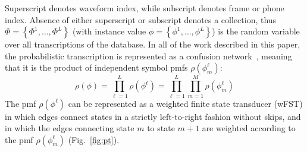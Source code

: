 Superscript denotes waveform index, while subscript denotes frame or
phone index.  Absence of either superscript or subscript denotes a
collection, thus $\Phi=\left\{\Phi^1,\ldots,\Phi^L\right\}$ (with
instance value $\phi=\left\{\phi^1,\ldots,\phi^L\right\}$) is the
random variable over all transcriptions of the database.  In all of
the work described in this paper, the probabilistic transcription is
represented as a confusion network~\cite{Mangu00}, meaning that it is
the product of independent symbol pmfs $\rho(\phi_m^\ell)$:
\begin{equation}
  \rho(\phi)=\prod_{\ell=1}^L\rho(\phi^\ell)=
  \prod_{\ell=1}^L \prod_{m=1}^M \rho(\phi_m^{\ell})
\end{equation}
The pmf $\rho(\phi^\ell)$ can be represented as a weighted
finite state transducer (wFST) in which edges connect states in a
strictly left-to-right fashion without skips, and in which the edges
connecting state $m$ to state $m+1$ are weighted according to the pmf
$\rho(\phi_m^\ell)$ (Fig.~\ref{fig:pt}).
